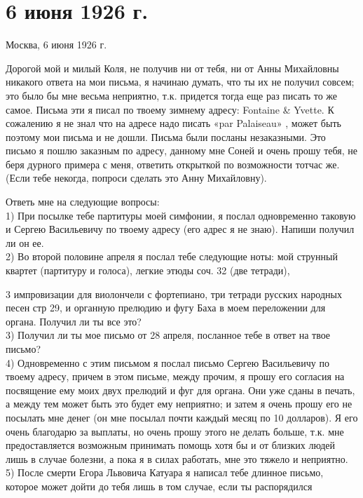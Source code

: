 \section{6 июня 1926 г.}


Москва, 6 июня 1926 г.

Дорогой мой и милый Коля, не получив ни от тебя, ни от Анны Михайловны никакого
ответа на мои письма, я начинаю думать, что ты их не получил совсем; это было
бы мне весьма неприятно, т.к. придется тогда еще раз писать то же самое. Письма
эти я писал по твоему зимнему адресу: Fontaine \& Yvette. К сожалению я не
знал что на адресе надо писать «par Palaiseau» , может быть поэтому мои письма
и не дошли. Письма были посланы незаказными. Это письмо я пошлю заказным по
адресу, данному мне Соней и очень прошу тебя, не беря дурного примера с меня,
ответить открыткой по возможности тотчас же. (Если тебе некогда, попроси
сделать это Анну Михайловну).

Ответь мне на следующие вопросы: \\
1) При посылке тебе партитуры моей симфонии, я послал одновременно таковую и
Сергею Васильевичу по твоему адресу (его адрес я не знаю). Напиши получил ли он
ее. \\
2) Во второй половине апреля я послал тебе следующие ноты: мой струнный квартет
(партитуру и голоса), легкие этюды соч. 32 (две тетради),



3 импровизации для виолончели с фортепиано, три тетради русских народных песен
стр 29, и органную прелюдию и фугу Баха в моем переложении для органа. Получил
ли ты все это? \\
3) Получил ли ты мое письмо от 28 апреля, посланное тебе в ответ на твое
письмо? \\
4) Одновременно с этим письмом я послал письмо Сергею Васильевичу по твоему
адресу, причем в этом письме, между прочим, я прошу его согласия на посвящение
ему моих двух прелюдий и фуг для органа. Они уже сданы в печать, а между тем
может быть это будет ему неприятно; и затем я очень прошу его не посылать мне
денег (он мне посылал почти каждый месяц по 10 долларов). Я его очень благодарю
за выплаты, но очень прошу этого не делать больше, т.к. мне предоставляется
возможным принимать помощь хотя бы и от близких людей лишь в случае болезни, а
пока я в силах работать, мне это тяжело и неприятно.
5) После смерти Егора Львовича Катуара я написал тебе длинное письмо, которое
может дойти до тебя лишь в том случае, если ты распорядился

